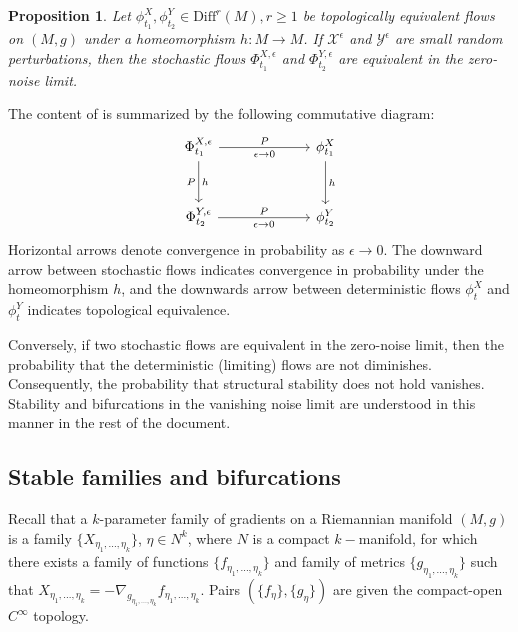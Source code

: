 \documentclass[12pt]{article}
\newtheorem{proposition}[theorem]{Proposition}
\begin{document}
\begin{proposition}
\label{proposition:topological-eq-implies-zero-noise-equivalent}
    Let $\phi_{t_1}^{X},\phi_{t_2}^{Y} \in \text{Diff}^r(M), r\geq 1$ be topologically equivalent flows on $(M,g)$ under a homeomorphism $h: M \rightarrow M$. If $\mathcal{X}^{\epsilon}$ and $\mathcal{Y}^{\epsilon}$ are small random perturbations, then the stochastic flows $\Phi_{t_1}^{X,\epsilon}$ and $\Phi_{t_2}^{Y,\epsilon}$ are equivalent in the zero-noise limit.
\end{proposition}
\noindent
The content of  is summarized by the following commutative diagram:
\begin{equation*}
    \begin{tikzcd}[column sep=6.5em, row sep=3.em]
    \Phi^{X,\epsilon}_{t_1} \arrow[r, "P", "\epsilon \rightarrow 0" swap] \arrow[d, "h", "P" swap]
    & \phi^{X}_{t_1} \arrow[d, "h"]  \\
    \Phi^{Y,\epsilon}_{t_2}  \arrow[r, "P", "\epsilon \rightarrow 0" swap]
    & \phi^{Y}_{t_2}
    \end{tikzcd} 
\end{equation*}
Horizontal arrows denote convergence in probability as $\epsilon \rightarrow 0$. The downward arrow between stochastic flows indicates convergence in probability under the homeomorphism $h$, and the downwards arrow between deterministic flows $\phi_t^X$ and $\phi_t^Y$ indicates topological equivalence. 

Conversely, if two stochastic flows are equivalent in the zero-noise limit, then the probability that the deterministic (limiting) flows are not diminishes. Consequently, the probability that structural stability does not hold vanishes. Stability and bifurcations in the vanishing noise limit are understood in this manner in the rest of the document.



\subsection{Stable families and bifurcations}
\label{subsubsection:stable-families-of-gradients}
Recall that a $k$-parameter family of gradients on a Riemannian manifold $(M,g)$ is a family $\{ X_{\eta_1,...,\eta_k} \}$, $\eta \in N^k$, where $N$ is a compact $k-$manifold, for which there exists a family of functions $\{f_{\eta_1,...,\eta_k} \}$ and family of metrics $\{ g_{{\eta_1,...,\eta_k}}\}$ such that $X_{\eta_1,...,\eta_k} = -\nabla_{g_{\eta_1,...,\eta_k}} f_{\eta_1,...,\eta_k}$. Pairs $\left ( \{f_{\eta}\}, \{g_{\eta} \}\right )$ are given the compact-open $C^{\infty}$ topology. 
\end{document}
